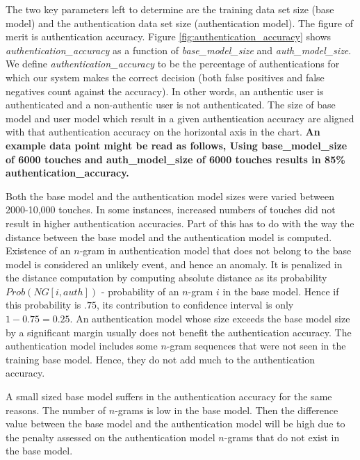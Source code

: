 \documentclass{acm_proc_article-sp}
\begin{document}
%
The two key parameters left to determine are the training data set size (base model) and the 
authentication data set size (authentication model). The figure of merit is authentication accuracy.
Figure \ref{fig:authentication_accuracy} shows {\it authentication\_accuracy} as a function of {\it base\_model\_size} 
and {\it auth\_model\_size}. We define {\it authentication\_accuracy} to be the percentage of authentications for which our system makes the correct decision (both false positives and
false negatives count against the accuracy).
In other words, an authentic user is authenticated and a non-authentic user is not authenticated.
The size of base model and user model which result in a given authentication accuracy are aligned with that authentication accuracy on the horizontal axis in the chart.
\textbf{
An example data point might be read as follows,
Using base\_model\_size of 6000 touches and
auth\_model\_size of 6000 touches results in
85\% authentication\_accuracy.
}

Both the base model and the authentication model sizes were varied between 2000-10,000 touches.
In some instances, increased numbers of touches did not result in higher authentication accuracies. 
Part of this has to do with the way the distance between the base model and the authentication
model is computed. Existence of an $n$-gram in authentication model that does not belong to the base model
is considered an unlikely event, and hence an anomaly. It is penalized in the distance computation
by computing absolute distance as its probability $Prob(NG[i, auth])$ - probability of an $n$-gram
$i$ in the base model. Hence if this probability is $.75$, its contribution to
confidence interval is only $1-0.75=0.25$.
An authentication model whose size exceeds the base model size by a significant margin usually
does not benefit the authentication accuracy. The authentication model includes some
$n$-gram sequences that were not seen in the training base model. Hence, they do not add much to the
authentication accuracy.

A small sized base model suffers in the authentication accuracy for the same reasons. 
The number of $n$-grams is low in the base model.  Then the difference value between the base
model and the authentication model will be high due to the penalty assessed on the authentication model
$n$-grams that do not exist in the base model. 
\end{document}
